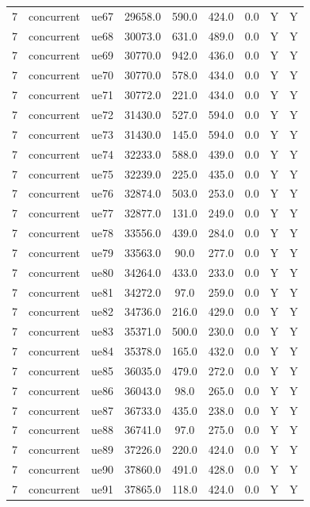 \begin{table}[ht]
\begin{tabular}{|c|c|c|c|c|c|c|c|c|}
7 & concurrent & ue67 & 29658.0 & 590.0 & 424.0 & 0.0 & Y & Y \\
7 & concurrent & ue68 & 30073.0 & 631.0 & 489.0 & 0.0 & Y & Y \\
7 & concurrent & ue69 & 30770.0 & 942.0 & 436.0 & 0.0 & Y & Y \\
7 & concurrent & ue70 & 30770.0 & 578.0 & 434.0 & 0.0 & Y & Y \\
7 & concurrent & ue71 & 30772.0 & 221.0 & 434.0 & 0.0 & Y & Y \\
7 & concurrent & ue72 & 31430.0 & 527.0 & 594.0 & 0.0 & Y & Y \\
7 & concurrent & ue73 & 31430.0 & 145.0 & 594.0 & 0.0 & Y & Y \\
7 & concurrent & ue74 & 32233.0 & 588.0 & 439.0 & 0.0 & Y & Y \\
7 & concurrent & ue75 & 32239.0 & 225.0 & 435.0 & 0.0 & Y & Y \\
7 & concurrent & ue76 & 32874.0 & 503.0 & 253.0 & 0.0 & Y & Y \\
7 & concurrent & ue77 & 32877.0 & 131.0 & 249.0 & 0.0 & Y & Y \\
7 & concurrent & ue78 & 33556.0 & 439.0 & 284.0 & 0.0 & Y & Y \\
7 & concurrent & ue79 & 33563.0 & 90.0 & 277.0 & 0.0 & Y & Y \\
7 & concurrent & ue80 & 34264.0 & 433.0 & 233.0 & 0.0 & Y & Y \\
7 & concurrent & ue81 & 34272.0 & 97.0 & 259.0 & 0.0 & Y & Y \\
7 & concurrent & ue82 & 34736.0 & 216.0 & 429.0 & 0.0 & Y & Y \\
7 & concurrent & ue83 & 35371.0 & 500.0 & 230.0 & 0.0 & Y & Y \\
7 & concurrent & ue84 & 35378.0 & 165.0 & 432.0 & 0.0 & Y & Y \\
7 & concurrent & ue85 & 36035.0 & 479.0 & 272.0 & 0.0 & Y & Y \\
7 & concurrent & ue86 & 36043.0 & 98.0 & 265.0 & 0.0 & Y & Y \\
7 & concurrent & ue87 & 36733.0 & 435.0 & 238.0 & 0.0 & Y & Y \\
7 & concurrent & ue88 & 36741.0 & 97.0 & 275.0 & 0.0 & Y & Y \\
7 & concurrent & ue89 & 37226.0 & 220.0 & 424.0 & 0.0 & Y & Y \\
7 & concurrent & ue90 & 37860.0 & 491.0 & 428.0 & 0.0 & Y & Y \\
7 & concurrent & ue91 & 37865.0 & 118.0 & 424.0 & 0.0 & Y & Y \\

\end{tabular}
\end{table}
